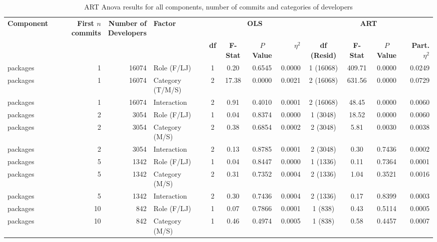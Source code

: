 \begin{landscape}
\begin{table}[H]
\centering
\setlength{\tabcolsep}{2pt}
\caption[ART Anova for all components]{ART Anova results for all components, number of commits and categories of developers}
\begin{tabular}{l r r l ccc r ccc r}
\toprule
\textbf{Component} & \makecell[t]{\textbf{First $n$}\\\textbf{commits}} & \makecell[t]{\textbf{Number of}\\\textbf{Developers}} & \textbf{Factor} & \multicolumn{4}{c}{\textbf{OLS}} & \multicolumn{4}{c}{\textbf{ART}} \\ 
\cmidrule(lr){5-8} \cmidrule(lr){9-12}
 &  &  &  & \textbf{df} & \textbf{F-Stat} & \textbf{$P$ Value} & \textbf{$\eta^2$} & \textbf{df (Resid)} & \textbf{F-Stat} & \textbf{$P$ Value} & \makecell[t]{\textbf{Part.}\\\textbf{$\eta^2$}} \\ 
\midrule
packages & 1 & 16074 & Role (F/LJ) & 1 & 0.20 & 0.6545 & 0.0000 & 1 (16068) & 409.71 & 0.0000 & 0.0249 \\ 
packages & 1 & 16074 & Category (T/M/S) & 2 & 17.38 & 0.0000 & 0.0021 & 2 (16068) & 631.56 & 0.0000 & 0.0729 \\ 
packages & 1 & 16074 & Interaction & 2 & 0.91 & 0.4010 & 0.0001 & 2 (16068) & 48.45 & 0.0000 & 0.0060 \\ 
packages & 2 & 3054 & Role (F/LJ) & 1 & 0.04 & 0.8374 & 0.0000 & 1 (3048) & 18.52 & 0.0000 & 0.0060 \\ 
packages & 2 & 3054 & Category (M/S) & 2 & 0.38 & 0.6854 & 0.0002 & 2 (3048) & 5.81 & 0.0030 & 0.0038 \\ 
packages & 2 & 3054 & Interaction & 2 & 0.13 & 0.8785 & 0.0001 & 2 (3048) & 0.30 & 0.7436 & 0.0002 \\ 
packages & 5 & 1342 & Role (F/LJ) & 1 & 0.04 & 0.8447 & 0.0000 & 1 (1336) & 0.11 & 0.7364 & 0.0001 \\ 
packages & 5 & 1342 & Category (M/S) & 2 & 0.31 & 0.7352 & 0.0004 & 2 (1336) & 1.04 & 0.3521 & 0.0016 \\ 
packages & 5 & 1342 & Interaction & 2 & 0.30 & 0.7436 & 0.0004 & 2 (1336) & 0.17 & 0.8399 & 0.0003 \\ 
packages & 10 & 842 & Role (F/LJ) & 1 & 0.07 & 0.7866 & 0.0001 & 1 (838) & 0.43 & 0.5114 & 0.0005 \\ 
packages & 10 & 842 & Category (M/S) & 1 & 0.46 & 0.4974 & 0.0005 & 1 (838) & 0.58 & 0.4457 & 0.0007 \\ 

\end{tabular}
\end{table}
\end{landscape}
